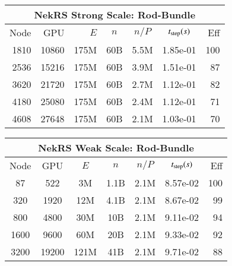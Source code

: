  \begin{table}[!t]
 \footnotesize
 \begin{center} \begin{tabular}{|r|r|r|c|c|c|r|}
  \hline
  \multicolumn{7}{|c|}{{\bf NekRS Strong Scale:  Rod-Bundle}}\\
  \hline
 Node & GPU   & $E$ & $n$ & $n/P$ & $t_{\rm step} (s) $ & Eff  \\
 \hline
 1810 &10860 &  175M & 60B &5.5M &1.85e-01 & 100  \\
 2536 &15216 &  175M & 60B &3.9M &1.51e-01 &  87  \\
 3620 &21720 &  175M & 60B &2.7M &1.12e-01 &  82  \\
 4180 &25080 &  175M & 60B &2.4M &1.12e-01 &  71  \\
 4608 &27648 &  175M & 60B &2.1M &1.03e-01 &  70  \\
  \hline
 \end{tabular}
 \end{center}
 \begin{center} \begin{tabular}{|c|c|c|c|c|c|r|}
  \hline
  \multicolumn{7}{|c|}{{\bf NekRS Weak Scale: Rod-Bundle}}\\
  \hline
 Node & GPU &  $E$ & $n$      &  $n/P$& $t_{\rm step}(s)$ & Eff \\
 \hline
 87   & 522   & 3M        & 1.1B  &  2.1M  & 8.57e-02  & 100   \\%
 320  & 1920  & 12M       & 4.1B  &  2.1M  & 8.67e-02  & 99    \\%
 800  & 4800  & 30M       & 10B   &  2.1M  & 9.11e-02  & 94    \\%
 1600 & 9600  & 60M       & 20B   &  2.1M  & 9.33e-02  & 92    \\%
 3200 & 19200 & 121M      & 41B   &  2.1M  & 9.71e-02  & 88    \\%

\end{tabular}
\end{center}
\end{table}
